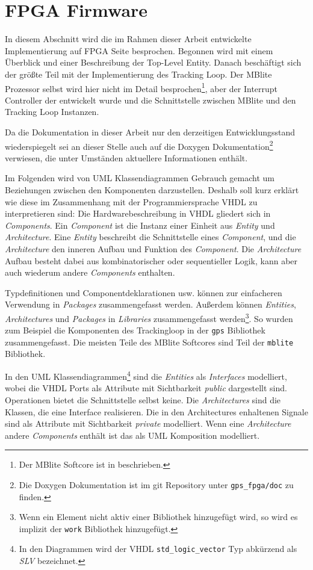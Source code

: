 \section{FPGA Firmware}
In diesem Abschnitt wird die im Rahmen dieser Arbeit entwickelte Implementierung auf FPGA Seite besprochen. Begonnen wird mit einem Überblick und einer Beschreibung der Top-Level Entity. Danach beschäftigt sich der größte Teil mit der Implementierung des Tracking Loop. Der MBlite Prozessor selbst wird hier nicht im Detail besprochen\footnote{Der MBlite Softcore ist in \cite{MBliteThesis} beschrieben.}, aber der Interrupt Controller der entwickelt wurde und die Schnittstelle zwischen MBlite und den Tracking Loop Instanzen. 

Da die Dokumentation in dieser Arbeit nur den derzeitigen Entwicklungsstand wiederspiegelt sei an dieser Stelle auch auf die Doxygen Dokumentation\footnote{Die Doxygen Dokumentation ist im git Repository unter \lstinline$gps_fpga/doc$ zu finden.} verwiesen, die unter Umständen aktuellere Informationen enthält. 

Im Folgenden wird von UML Klassendiagrammen Gebrauch gemacht um Beziehungen zwischen den Komponenten darzustellen. Deshalb soll kurz erklärt wie diese im Zusammenhang mit der Programmiersprache VHDL zu interpretieren sind: Die Hardwarebeschreibung in VHDL gliedert sich in \emph{Components}. Ein \emph{Component} ist die Instanz einer Einheit aus \emph{Entity} und  \emph{Architecture}. Eine \emph{Entity} beschreibt die Schnittstelle eines \emph{Component}, und die \emph{Architecture} den inneren Aufbau und Funktion des \emph{Component}. Die \emph{Architecture} Aufbau besteht dabei aus kombinatorischer oder sequentieller Logik, kann aber auch wiederum andere \emph{Components} enthalten.

Typdefinitionen und Componentdeklarationen usw. können zur einfacheren Verwendung in \emph{Packages} zusammengefasst werden. Außerdem können \emph{Entities}, \emph{Architectures} und \emph{Packages} in \emph{Libraries} zusammengefasst werden\footnote{Wenn ein Element nicht aktiv einer Bibliothek hinzugefügt wird, so wird es implizit der \lstinline$work$ Bibliothek hinzugefügt.}. So wurden zum Beispiel die Komponenten des Trackingloop in der \lstinline$gps$ Bibliothek zusammengefasst. Die meisten Teile des MBlite Softcores sind Teil der \lstinline$mblite$ Bibliothek.

In den UML Klassendiagrammen\footnote{In den Diagrammen wird der VHDL \lstinline$std_logic_vector$ Typ abkürzend als \emph{SLV} bezeichnet.} sind die \emph{Entities} als  \emph{Interfaces} modelliert, wobei die VHDL Ports als Attribute mit Sichtbarkeit \emph{public} dargestellt sind. Operationen bietet die Schnittstelle selbst keine. Die \emph{Architectures} sind die Klassen, die eine Interface realisieren. Die in den Architectures enhaltenen Signale sind als Attribute mit Sichtbarkeit \emph{private} modelliert. Wenn eine \emph{Architecture} andere \emph{Components} enthält ist das als UML Komposition modelliert.

